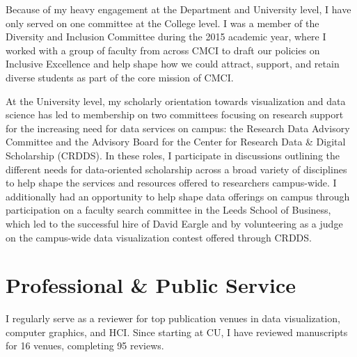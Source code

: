 \documentclass[11pt]{article}
\begin{document}

Because of my heavy engagement at the Department and University level, I have only served on one committee at the College level. I was a member of the Diversity and Inclusion Committee during the 2015 academic year, where I worked with a group of faculty from across CMCI to draft our policies on Inclusive Excellence and help shape how we could attract, support, and retain diverse students as part of the core mission of CMCI. 

At the University level, my scholarly orientation towards visualization and data science has led to membership on two committees focusing on research support for the increasing need for data services on campus: the Research Data Advisory Committee and the Advisory Board for the Center for Research Data \& Digital Scholarship (CRDDS). In these roles, I participate in discussions outlining the different needs for data-oriented scholarship across a broad variety of disciplines to help shape the services and resources offered to researchers campus-wide. I additionally had an opportunity to help shape data offerings on campus through participation on a faculty search committee in the Leeds School of Business, which led to the successful hire of David Eargle and by volunteering as a judge on the campus-wide data visualization contest offered through CRDDS. 


\section*{Professional \& Public Service}
I regularly serve as a reviewer for top publication venues in data visualization, computer graphics, and HCI. Since starting at CU, I have reviewed manuscripts for 16 venues, completing 95 reviews. 
\end{document}
